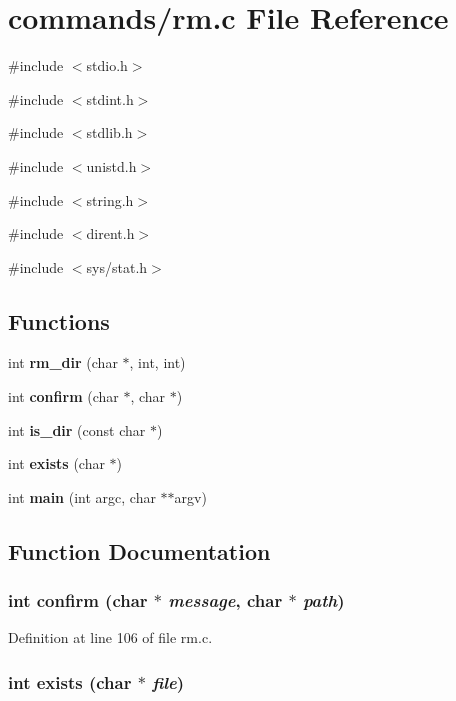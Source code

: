 \section{commands/rm.c File Reference}
\label{rm_8c}
{\ttfamily \#include $<$stdio.h$>$}\par
{\ttfamily \#include $<$stdint.h$>$}\par
{\ttfamily \#include $<$stdlib.h$>$}\par
{\ttfamily \#include $<$unistd.h$>$}\par
{\ttfamily \#include $<$string.h$>$}\par
{\ttfamily \#include $<$dirent.h$>$}\par
{\ttfamily \#include $<$sys/stat.h$>$}\par
\subsection*{Functions}
\begin{DoxyCompactItemize}
\item 
int {\bf rm\_\-dir} (char $\ast$, int, int)
\item 
int {\bf confirm} (char $\ast$, char $\ast$)
\item 
int {\bf is\_\-dir} (const char $\ast$)
\item 
int {\bf exists} (char $\ast$)
\item 
int {\bf main} (int argc, char $\ast$$\ast$argv)
\end{DoxyCompactItemize}


\subsection{Function Documentation}
\subsubsection[{confirm}]{\setlength{\rightskip}{0pt plus 5cm}int confirm (char $\ast$ {\em message}, \/  char $\ast$ {\em path})}\label{rm_8c_a9ef1dd18b9d9e57d2ca84b42718b979e}


Definition at line 106 of file rm.c.

\subsubsection[{exists}]{\setlength{\rightskip}{0pt plus 5cm}int exists (char $\ast$ {\em file})}\label{rm_8c_a436bca6fd78f0ec6e0b6a304affe17e6}


